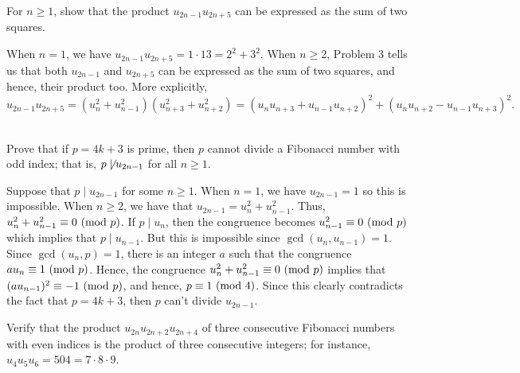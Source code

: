 \begin{exercise}
    For $n \geq 1$, show that the product $u_{2n-1}u_{2n+5}$ can be expressed as the sum of two squares.  \\
\end{exercise}

\begin{solution}
    When $n = 1$, we have $u_{2n-1}u_{2n+5} = 1\cdot 13 = 2^2 + 3^2$. When $n \geq 2$, Problem 3 tells us that both $u_{2n-1}$ and $u_{2n+5}$ can be expressed as the sum of two squares, and hence, their product too. More explicitly,
    $$u_{2n-1}u_{2n+5} = (u_n^2 + u_{n-1}^2)(u_{n+3}^2 + u_{n+2}^2) = (u_nu_{n+3} + u_{n-1}u_{n+2})^2 + (u_nu_{n+2} - u_{n-1}u_{n+3})^2.$$ \\
\end{solution}

\begin{exercise}
    Prove that if $p = 4k + 3$ is prime, then $p$ cannot divide a Fibonacci number with odd index; that is, $p \not\mid u_{2n-1}$ for all $n \geq 1$.  \\
\end{exercise}

\begin{solution}
    Suppose that $p \mid u_{2n-1}$ for some $n \geq 1$. When $n = 1$, we have $u_{2n-1} = 1$ so this is impossible. When $n \geq 2$, we have that $u_{2n-1} = u_n^2 + u_{n-1}^2$. Thus, $u_n^2 + u_{n-1}^2 \equiv 0 \ (\mathrm{mod}\ p)$. If $p \mid u_n$, then the congruence becomes $u_{n-1}^2 \equiv 0 \ (\mathrm{mod}\ p)$ which implies that $p \mid u_{n-1}$. But this is impossible since $\gcd(u_n, u_{n-1}) = 1$. Since $\gcd(u_n, p) = 1$, there is an integer $a$ such that the congruence $au_n \equiv 1 \ (\mathrm{mod}\ p)$. Hence, the congruence $u_n^2 + u_{n-1}^2 \equiv 0 \ (\mathrm{mod}\ p)$ implies that $(au_{n-1})^2 \equiv -1 \ (\mathrm{mod}\ p)$, and hence, $p \equiv 1 \ (\mathrm{mod}\ 4)$. Since this clearly contradicts the fact that $p = 4k + 3$, then $p$ can't divide $u_{2n-1}$. \\ 
\end{solution}

\begin{exercise}
    Verify that the product $u_{2n}u_{2n+2}u_{2n+4}$ of three consecutive Fibonacci numbers with even indices is the product of three consecutive integers; for instance, $u_4u_5u_6 = 504 = 7\cdot 8 \cdot 9$.  \\
\end{exercise}

